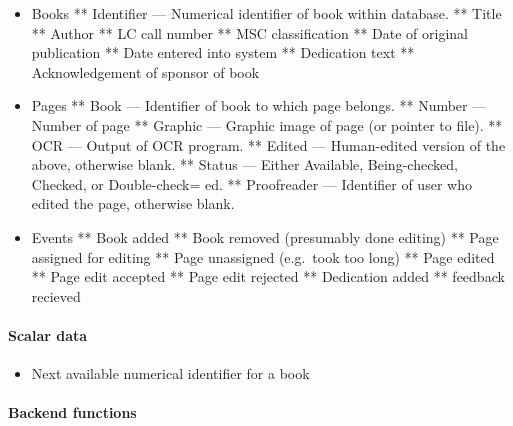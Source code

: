 \begin{itemize}
\item
  Books ** Identifier --- Numerical identifier of book within database.
  ** Title ** Author ** LC call number ** MSC classification ** Date of
  original publication ** Date entered into system ** Dedication text **
  Acknowledgement of sponsor of book
\item
  Pages ** Book --- Identifier of book to which page belongs. ** Number
  --- Number of page ** Graphic --- Graphic image of page (or pointer to
  file). ** OCR --- Output of OCR program. ** Edited --- Human-edited
  version of the above, otherwise blank. ** Status --- Either Available,
  Being-checked, Checked, or Double-check= ed. ** Proofreader ---
  Identifier of user who edited the page, otherwise blank.
\item
  Events ** Book added ** Book removed (presumably done editing) ** Page
  assigned for editing ** Page unassigned (e.g.~took too long) ** Page
  edited ** Page edit accepted ** Page edit rejected ** Dedication added
  ** feedback recieved
\end{itemize}

\paragraph{Scalar data}

\begin{itemize}
\item
  Next available numerical identifier for a book
\end{itemize}

\paragraph{Backend functions}

